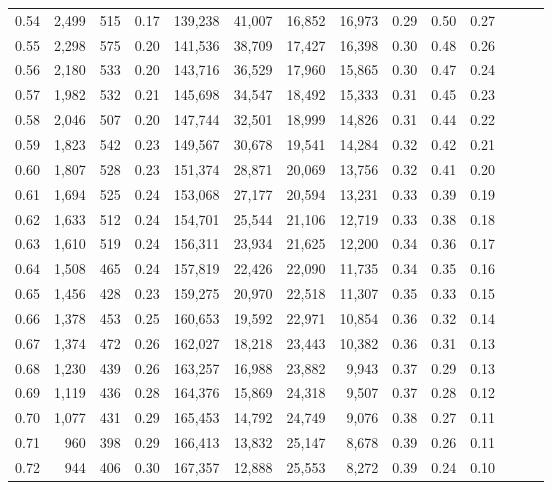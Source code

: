 \begin{tabular}{rrrrrrrrrrrrrr}
0.54 &  2,499 &  515 &  0.17 &  139,238 &   41,007 &  16,852 &  16,973 &  0.29 &  0.50 &      0.27 \\
0.55 &  2,298 &  575 &  0.20 &  141,536 &   38,709 &  17,427 &  16,398 &  0.30 &  0.48 &      0.26 \\
0.56 &  2,180 &  533 &  0.20 &  143,716 &   36,529 &  17,960 &  15,865 &  0.30 &  0.47 &      0.24 \\
0.57 &  1,982 &  532 &  0.21 &  145,698 &   34,547 &  18,492 &  15,333 &  0.31 &  0.45 &      0.23 \\
0.58 &  2,046 &  507 &  0.20 &  147,744 &   32,501 &  18,999 &  14,826 &  0.31 &  0.44 &      0.22 \\
0.59 &  1,823 &  542 &  0.23 &  149,567 &   30,678 &  19,541 &  14,284 &  0.32 &  0.42 &      0.21 \\
0.60 &  1,807 &  528 &  0.23 &  151,374 &   28,871 &  20,069 &  13,756 &  0.32 &  0.41 &      0.20 \\
0.61 &  1,694 &  525 &  0.24 &  153,068 &   27,177 &  20,594 &  13,231 &  0.33 &  0.39 &      0.19 \\
0.62 &  1,633 &  512 &  0.24 &  154,701 &   25,544 &  21,106 &  12,719 &  0.33 &  0.38 &      0.18 \\
0.63 &  1,610 &  519 &  0.24 &  156,311 &   23,934 &  21,625 &  12,200 &  0.34 &  0.36 &      0.17 \\
0.64 &  1,508 &  465 &  0.24 &  157,819 &   22,426 &  22,090 &  11,735 &  0.34 &  0.35 &      0.16 \\
0.65 &  1,456 &  428 &  0.23 &  159,275 &   20,970 &  22,518 &  11,307 &  0.35 &  0.33 &      0.15 \\
0.66 &  1,378 &  453 &  0.25 &  160,653 &   19,592 &  22,971 &  10,854 &  0.36 &  0.32 &      0.14 \\
0.67 &  1,374 &  472 &  0.26 &  162,027 &   18,218 &  23,443 &  10,382 &  0.36 &  0.31 &      0.13 \\
0.68 &  1,230 &  439 &  0.26 &  163,257 &   16,988 &  23,882 &   9,943 &  0.37 &  0.29 &      0.13 \\
0.69 &  1,119 &  436 &  0.28 &  164,376 &   15,869 &  24,318 &   9,507 &  0.37 &  0.28 &      0.12 \\
0.70 &  1,077 &  431 &  0.29 &  165,453 &   14,792 &  24,749 &   9,076 &  0.38 &  0.27 &      0.11 \\
0.71 &    960 &  398 &  0.29 &  166,413 &   13,832 &  25,147 &   8,678 &  0.39 &  0.26 &      0.11 \\
0.72 &    944 &  406 &  0.30 &  167,357 &   12,888 &  25,553 &   8,272 &  0.39 &  0.24 &      0.10 \\

\end{tabular}
